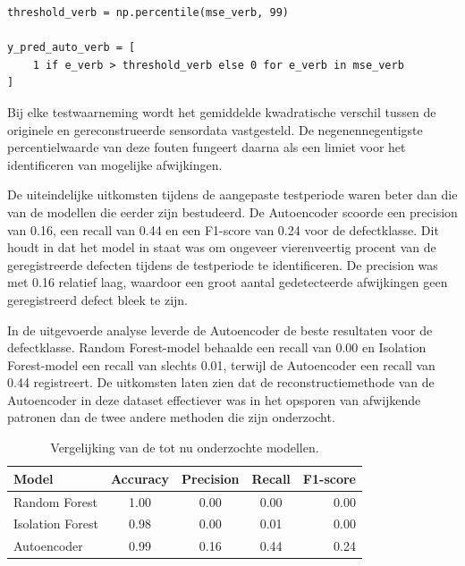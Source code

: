 {{{\begin{listing}[H]
\begin{verbatim}
threshold_verb = np.percentile(mse_verb, 99)

y_pred_auto_verb = [
    1 if e_verb > threshold_verb else 0 for e_verb in mse_verb
]
\end{verbatim}
\caption[Code snippet: berekening reconstructiefout en  anomaliegrens Autoencoder]{Codefragment van de berekening van de reconstructiefout en de anomaliedrempel voor de autoencoder op de MetroPT-3-dataset.}
\end{listing}

Bij elke testwaarneming wordt het gemiddelde kwadratische verschil tussen de originele en gereconstrueerde sensordata vastgesteld. De negenennegentigste percentielwaarde van deze fouten fungeert daarna als een limiet voor het identificeren van mogelijke afwijkingen.

De uiteindelijke uitkomsten tijdens de aangepaste testperiode waren beter dan die van de modellen die eerder zijn bestudeerd. De Autoencoder scoorde een precision van 0.16, een recall van 0.44 en een F1-score van 0.24 voor de defectklasse. Dit houdt in dat het model in staat was om ongeveer vierenveertig procent van de geregistreerde defecten tijdens de testperiode te identificeren. De precision was met 0.16 relatief laag, waardoor een groot aantal gedetecteerde afwijkingen geen geregistreerd defect bleek te zijn.

In de uitgevoerde analyse leverde de Autoencoder de beste resultaten voor de defectklasse. Random Forest-model behaalde een recall van 0.00 en Isolation Forest-model een recall van slechts 0.01, terwijl de Autoencoder een recall van 0.44 registreert. De uitkomsten laten zien dat de reconstructiemethode van de Autoencoder in deze dataset effectiever was in het opsporen van afwijkende patronen dan de twee andere methoden die zijn onderzocht.

\begin{table}[H]
\centering
\begin{tabular}{lcccr}
\toprule
\textbf{Model} & \textbf{Accuracy} & \textbf{Precision} & \textbf{Recall} & \textbf{F1-score} \\
\midrule
Random Forest                & 1.00           & 0.00 & 0.00 & 0.00                \\
Isolation Forest                & 0.98          & 0.00 & 0.01 & 0.00                \\
Autoencoder & 0.99 & 0.16 & 0.44 & 0.24 \\
\bottomrule
\end{tabular}
\caption[Tabel: vergelijking van de tot nu onderzochte modellen]{\label{tab:tabel_vergelijking_tot_nu_onderzochte_modellen}Vergelijking van de tot nu onderzochte modellen.}
\end{table}

}}}
